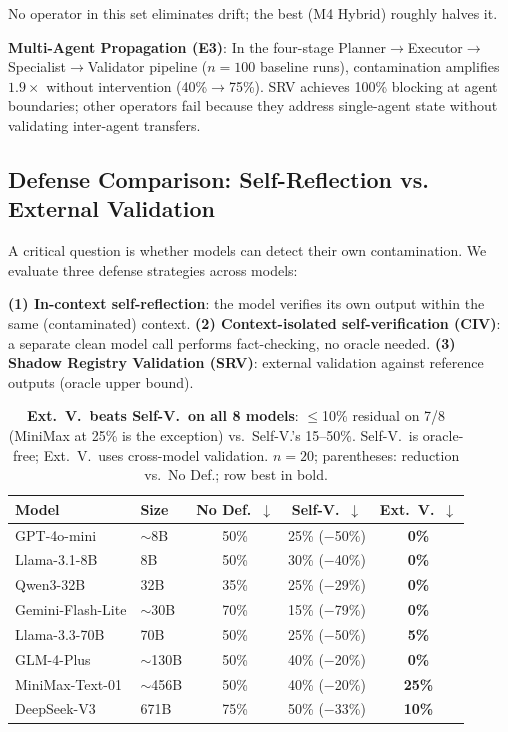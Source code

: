\documentclass{article}
\theoremstyle{plain}
\theoremstyle{definition}
\begin{document}
No operator in this set eliminates drift; the best (M4 Hybrid) roughly halves it.

\textbf{Multi-Agent Propagation (E3)}: In the four-stage Planner$\to$Executor$\to$Specialist$\to$Validator pipeline ($n=100$ baseline runs), contamination amplifies $1.9\times$ without intervention (40\%$\to$75\%). SRV achieves 100\% blocking at agent boundaries; other operators fail because they address single-agent state without validating inter-agent transfers.

\subsection{Defense Comparison: Self-Reflection vs. External Validation}

A critical question is whether models can detect their own contamination. We evaluate three defense strategies across models:

\textbf{(1) In-context self-reflection}: the model verifies its own output within the same (contaminated) context. \textbf{(2) Context-isolated self-verification (CIV)}: a separate clean model call performs fact-checking, no oracle needed. \textbf{(3) Shadow Registry Validation (SRV)}: external validation against reference outputs (oracle upper bound).

\begin{table}[!htbp]
\centering
\footnotesize
\setlength{\tabcolsep}{3pt}
\begin{tabular}{@{}llccc@{}}
\toprule
\textbf{Model} & \textbf{Size} & \textbf{No Def.\ $\downarrow$} & \textbf{Self-V.\ $\downarrow$} & \textbf{Ext.\ V.\ $\downarrow$} \\
\midrule
GPT-4o-mini & $\sim$8B & 50\% & 25\% {\scriptsize($-$50\%)} & \textbf{0\%} \\
Llama-3.1-8B & 8B & 50\% & 30\% {\scriptsize($-$40\%)} & \textbf{0\%} \\
Qwen3-32B & 32B & 35\% & 25\% {\scriptsize($-$29\%)} & \textbf{0\%} \\
Gemini-Flash-Lite & $\sim$30B & 70\% & 15\% {\scriptsize($-$79\%)} & \textbf{0\%} \\
Llama-3.3-70B & 70B & 50\% & 25\% {\scriptsize($-$50\%)} & \textbf{5\%} \\
GLM-4-Plus & $\sim$130B & 50\% & 40\% {\scriptsize($-$20\%)} & \textbf{0\%} \\
MiniMax-Text-01 & $\sim$456B & 50\% & 40\% {\scriptsize($-$20\%)} & \textbf{25\%} \\
DeepSeek-V3 & 671B & 75\% & 50\% {\scriptsize($-$33\%)} & \textbf{10\%} \\
\bottomrule
\end{tabular}
\caption{\textbf{Ext.\ V.\ beats Self-V.\ on all 8 models}: $\leq$10\% residual on 7/8 (MiniMax at 25\% is the exception) vs.\ Self-V.'s 15--50\%. Self-V.\ is oracle-free; Ext.\ V.\ uses cross-model validation. $n=20$; parentheses: reduction vs.\ No Def.; row best in bold.}
\label{tab:defense-comparison}
\end{table}
\end{document}
